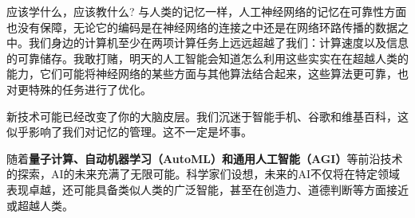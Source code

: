 应该学什么，应该教什么?
与人类的记忆一样，人工神经网络的记忆在可靠性方面也没有保障，无论它的编码是在神经网络的连接之中还是在网络环路传播的数据之中。我们身边的计算机至少在两项计算任务上远远超越了我们：计算速度以及信息的可靠储存。我敢打赌，明天的人工智能会知道怎么利用这些实实在在超越人类的能力，它们可能将神经网络的某些方面与其他算法结合起来，这些算法更可靠，也对更特殊的任务进行了优化。

新技术可能已经改变了你的大脑皮层。我们沉迷于智能手机、谷歌和维基百科，这似乎影响了我们对记忆的管理。这不一定是坏事。

%
%
%
%
%

随着{\bf 量子计算、自动机器学习（AutoML）和通用人工智能（AGI）}等前沿技术的探索，AI的未来充满了无限可能。科学家们设想，未来的AI不仅将在特定领域表现卓越，还可能具备类似人类的广泛智能，甚至在创造力、道德判断等方面接近或超越人类。

